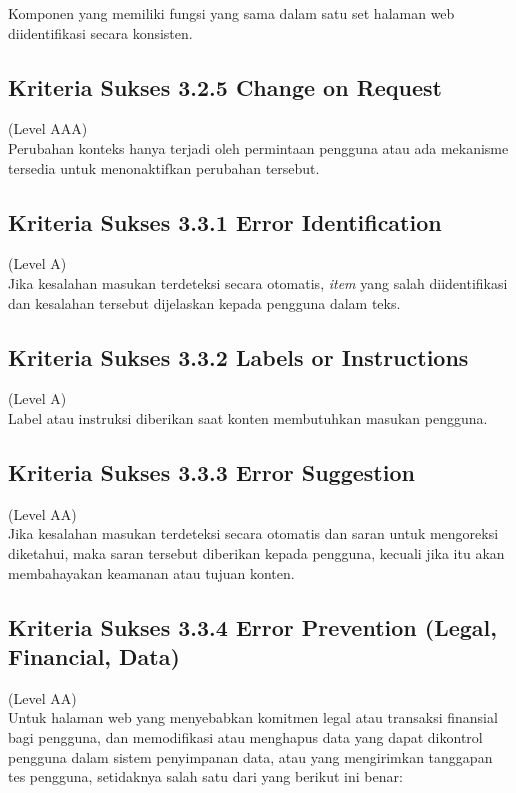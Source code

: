 Komponen yang memiliki fungsi yang sama dalam satu set halaman web diidentifikasi secara konsisten.

\subsection{Kriteria Sukses 3.2.5 Change on Request}
\label{subsec:kriteria_3.2.5}
(Level AAA) \\

Perubahan konteks hanya terjadi oleh permintaan pengguna atau ada mekanisme tersedia untuk menonaktifkan perubahan tersebut.

\subsection{Kriteria Sukses 3.3.1 Error Identification}
\label{subsec:kriteria_3.3.1}
(Level A) \\

Jika kesalahan masukan terdeteksi secara otomatis, \textit{item} yang salah diidentifikasi dan kesalahan tersebut dijelaskan kepada pengguna dalam teks.

\subsection{Kriteria Sukses 3.3.2 Labels or Instructions}
\label{subsec:kriteria_3.3.2}
(Level A) \\

Label atau instruksi diberikan saat konten membutuhkan masukan pengguna.

\subsection{Kriteria Sukses 3.3.3 Error Suggestion}
\label{subsec:kriteria_3.3.3}
(Level AA) \\

Jika kesalahan masukan terdeteksi secara otomatis dan saran untuk mengoreksi diketahui, maka saran tersebut diberikan kepada pengguna, kecuali jika itu akan membahayakan keamanan atau tujuan konten.

\subsection{Kriteria Sukses 3.3.4 Error Prevention (Legal, Financial, Data)}
\label{subsec:kriteria_3.3.4}
(Level AA) \\

Untuk halaman web yang menyebabkan komitmen legal atau transaksi finansial bagi pengguna, dan memodifikasi atau menghapus data yang dapat dikontrol pengguna dalam sistem penyimpanan data, atau yang mengirimkan tanggapan tes pengguna, setidaknya salah satu dari yang berikut ini benar:

